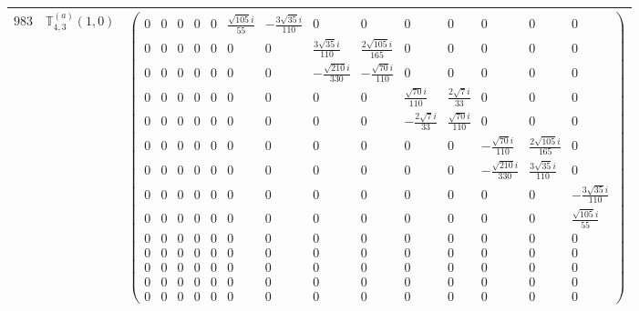 \documentclass[fleqn,8pt,landscape]{jsarticle}
\begin{document}
\begin{center}
\begin{longtable}{ccc}
$ 983 $ & $ \mathbb{T}_{4,3}^{(a)}(1,0) $ & $ \begin{pmatrix} 0 & 0 & 0 & 0 & 0 & \frac{\sqrt{105} i}{55} & - \frac{3 \sqrt{35} i}{110} & 0 & 0 & 0 & 0 & 0 & 0 & 0 \\ 0 & 0 & 0 & 0 & 0 & 0 & 0 & \frac{3 \sqrt{35} i}{110} & \frac{2 \sqrt{105} i}{165} & 0 & 0 & 0 & 0 & 0 \\ 0 & 0 & 0 & 0 & 0 & 0 & 0 & - \frac{\sqrt{210} i}{330} & - \frac{\sqrt{70} i}{110} & 0 & 0 & 0 & 0 & 0 \\ 0 & 0 & 0 & 0 & 0 & 0 & 0 & 0 & 0 & \frac{\sqrt{70} i}{110} & \frac{2 \sqrt{7} i}{33} & 0 & 0 & 0 \\ 0 & 0 & 0 & 0 & 0 & 0 & 0 & 0 & 0 & - \frac{2 \sqrt{7} i}{33} & \frac{\sqrt{70} i}{110} & 0 & 0 & 0 \\ 0 & 0 & 0 & 0 & 0 & 0 & 0 & 0 & 0 & 0 & 0 & - \frac{\sqrt{70} i}{110} & \frac{2 \sqrt{105} i}{165} & 0 \\ 0 & 0 & 0 & 0 & 0 & 0 & 0 & 0 & 0 & 0 & 0 & - \frac{\sqrt{210} i}{330} & \frac{3 \sqrt{35} i}{110} & 0 \\ 0 & 0 & 0 & 0 & 0 & 0 & 0 & 0 & 0 & 0 & 0 & 0 & 0 & - \frac{3 \sqrt{35} i}{110} \\ 0 & 0 & 0 & 0 & 0 & 0 & 0 & 0 & 0 & 0 & 0 & 0 & 0 & \frac{\sqrt{105} i}{55} \\ 0 & 0 & 0 & 0 & 0 & 0 & 0 & 0 & 0 & 0 & 0 & 0 & 0 & 0 \\ 0 & 0 & 0 & 0 & 0 & 0 & 0 & 0 & 0 & 0 & 0 & 0 & 0 & 0 \\ 0 & 0 & 0 & 0 & 0 & 0 & 0 & 0 & 0 & 0 & 0 & 0 & 0 & 0 \\ 0 & 0 & 0 & 0 & 0 & 0 & 0 & 0 & 0 & 0 & 0 & 0 & 0 & 0 \\ 0 & 0 & 0 & 0 & 0 & 0 & 0 & 0 & 0 & 0 & 0 & 0 & 0 & 0 \end{pmatrix} $ \\ \hline

\end{longtable}
\end{center}
\end{document}
